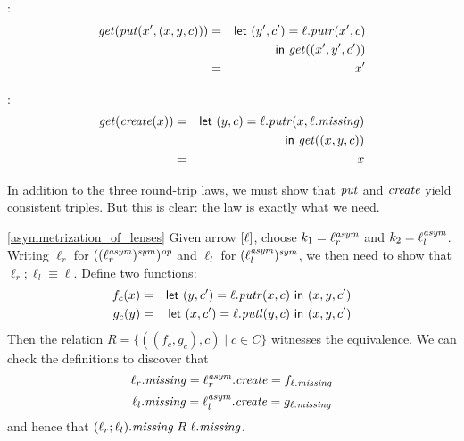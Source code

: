 \begin{defn}[$R$-similarity]
\begin{theorem}
\begin{lemma}
\begin{theorem}[No products]
\begin{lemma}
\begin{defn}
\begin{theorem}
\begin{corollary}[Hylomorphism]
\begin{defn}
\begin{defn}[Symmetrization]
\begin{theorem}
\begin{goodlens}
\noindent{}:
\begin{eqnarray*}
    \mathit{get}(\mathit{put}(x',(x,y,c)))
    &=& \mathsf{let}\  (y',c') = \ell.\mathit{putr}(x',c) \\
    & & \mathsf{in}\  \mathit{get}((x',y',c')) \\
    &=& x'
\end{eqnarray*}

\noindent{}:
\begin{eqnarray*}
    \mathit{get}(\mathit{create}(x))
    &=& \mathsf{let}\  (y,c) = \ell.\mathit{putr}(x,\ell.\mathit{missing}) \\
    & & \mathsf{in}\  \mathit{get}((x,y,c)) \\
    &=& x
\end{eqnarray*}

In addition to the three round-trip laws, we must show that $\mathit{put}$ and
$\mathit{create}$ yield consistent triples. But this is clear: the  law
is exactly what we need.
\end{goodlens}
\fi

\begin{pfof}{\ref{asymmetrization_of_lenses}}
Given \iffull arrow \fi $[\ell]$, choose $k_1 = \ell^\mathit{asym}_r$ and $k_2 =
\ell^\mathit{asym}_l$.
\iffull
Writing $\ell_r$ for $((\ell^\mathit{asym}_r)^\mathit{sym})^\mathit{op}$ and $\ell_l$ for
$(\ell^\mathit{asym}_l)^\mathit{sym}$, we then need to show that $\ell_r;\ell_l \equiv \ell$.
Define two functions:
\begin{eqnarray*}
    f_c(x) &=& \mathsf{let}\  (y,c') = \ell.\mathit{putr}(x,c) \ \mathsf{in}\  (x,y,c') \\
    g_c(y) &=& \mathsf{let}\  (x,c') = \ell.\mathit{putl}(y,c) \ \mathsf{in}\  (x,y,c')
\end{eqnarray*}
Then the relation $R = \{((f_c,g_c),c) \mid c \in C\}$ witnesses the
equivalence. We can check the definitions to discover that
\[\ell_r.\mathit{missing} = \ell^\mathit{asym}_r.\mathit{create} = f_{\ell.\mathit{missing}}\]
\[\ell_l.\mathit{missing} = \ell^\mathit{asym}_l.\mathit{create} = g_{\ell.\mathit{missing}}\]
and hence that $(\ell_r;\ell_l).\mathit{missing} \mathrel{R_{}} \ell.\mathit{missing}$.


\end{pfof}
\end{theorem}
\end{defn}
\end{defn}
\end{corollary}
\end{theorem}
\end{defn}
\end{lemma}
\end{theorem}
\end{lemma}
\end{theorem}
\end{defn}
